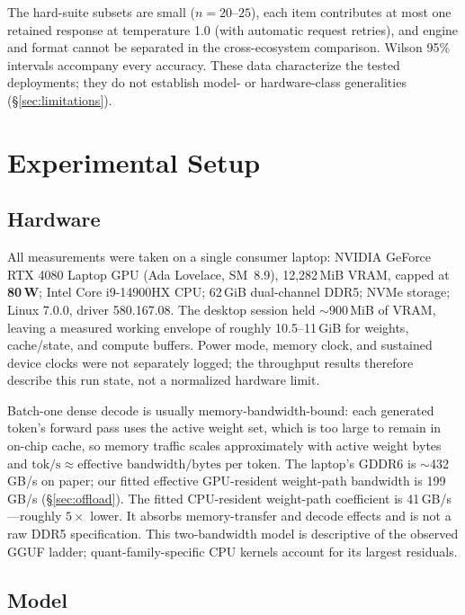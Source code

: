 \documentclass[11pt]{article}
\begin{document}
The hard-suite subsets are small ($n{=}20$--$25$), each item contributes at most
one retained response at temperature 1.0 (with automatic request retries),
and engine and format cannot be separated in the
cross-ecosystem comparison. Wilson 95\% intervals accompany every accuracy.
These data characterize the tested deployments; they do not establish model-
or hardware-class generalities (\S\ref{sec:limitations}).


\section{Experimental Setup}
\label{sec:setup}

\subsection{Hardware}
\label{sec:hw}

All measurements were taken on a single consumer laptop: NVIDIA GeForce RTX
4080 Laptop GPU (Ada Lovelace, SM~8.9), 12{,}282\,MiB VRAM, capped at
\textbf{80\,W}; Intel Core i9-14900HX CPU; 62\,GiB dual-channel DDR5; NVMe
storage; Linux 7.0.0, driver 580.167.08. The desktop session held
$\sim$900\,MiB of VRAM, leaving a measured working envelope of roughly
10.5--11\,GiB for weights, cache/state, and compute buffers. Power mode, memory
clock, and sustained device clocks were not separately logged; the throughput
results therefore describe this run state, not a normalized hardware limit.

Batch-one dense decode is usually memory-bandwidth-bound: each generated
token's forward pass uses the active weight set, which is too large to remain
in on-chip cache, so memory traffic scales approximately with active weight
bytes and $\text{tok/s} \approx
\text{effective bandwidth}/\text{bytes per token}$. The laptop's GDDR6 is
$\sim$432\,GB/s on paper; our fitted effective GPU-resident weight-path
bandwidth is 199\,GB/s (\S\ref{sec:offload}). The fitted CPU-resident
weight-path coefficient is 41\,GB/s---roughly $5\times$ lower. It absorbs
memory-transfer and decode effects and is not a raw DDR5 specification. This
two-bandwidth model is descriptive of the observed GGUF ladder;
quant-family-specific CPU kernels account for its largest residuals.


\subsection{Model}
\label{sec:model}
\end{document}

